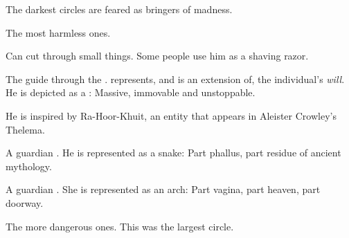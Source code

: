 The darkest circles are feared as bringers of madness.






\begin{subgloss}
  \begin{comment}
  \paragraph{Circle of Dusk}
  \end{comment}
  The most harmless ones. 
  
  \begin{sephlist}
    \seph{\Gavron}
    \index{\Gavron}
    Can cut through small things. 
    Some people use him as a shaving razor. 
    
    \seph{\KorRashad}
    \index{\KorRashad}
    The guide through the \empyrean{}. 
    \KorRashad{} represents, and is an extension of, the individual's \emph{will}. 
    He is depicted as a \mulgron: 
    Massive, immovable and unstoppable. 
    
    He is inspired by Ra-Hoor-Khuit, an entity that appears in Aleister Crowley's Thelema. 
    
    A guardian \qliphah. 
    He is represented as a snake: 
    Part phallus, part residue of ancient \ophidian{} mythology. 
    
    A guardian \qliphah. 
    She is represented as an arch: 
    Part vagina, part heaven, part doorway. 
   
  \end{sephlist}




  \begin{comment}
  \paragraph{Circle of Twilight}
  \end{comment}
  The more dangerous ones. 
  This was the largest circle. 
  

\end{subgloss}
